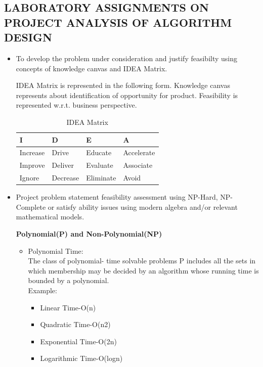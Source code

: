 \documentclass[12pt,a4paper]{report}
\begin{document}
\begin{appendices}
\chapter{LABORATORY ASSIGNMENTS ON PROJECT ANALYSIS OF ALGORITHM DESIGN}
\newpage

\begin{itemize}
	\item To develop the problem under consideration and justify feasibilty using
	concepts of knowledge canvas and IDEA Matrix.
	
	\hspace{0.5in}IDEA Matrix is represented in the following form. Knowledge canvas represents about identification of opportunity for product. Feasibility is represented w.r.t. business perspective.
	\begin{table}[!h]
		\centering
		\begin{tabular}{|p{2cm}|p{2cm}|p{2cm}|p{2cm}|}
		\hline
			I & D & E & A\\
			\hline
			Increase & Drive & Educate & Accelerate\\
			\hline
			Improve& Deliver& Evaluate& Associate\\
			\hline
			Ignore& Decrease& Eliminate& Avoid\\
			\hline
		\end{tabular}
		\caption{IDEA Matrix}
	\end{table}
	
	\item Project problem statement feasibility assessment using NP-Hard, NP-
	Complete or satisfy ability issues using modern algebra and/or relevant
	mathematical models.
	
	\textbf{Polynomial(P) and Non-Polynomial(NP)}
	\begin{itemize}
\item 	Polynomial Time:\\
	\hspace{0.5in}The class of polynomial- time solvable problems P includes all the sets in which membership may be decided by an algorithm whose running time is bounded by a polynomial.\\
	Example:
	\begin{itemize}
	\item Linear Time-O(n)
	\item Quadratic Time-O(n2)
	\item Exponential Time-O(2n)
	\item Logarithmic Time-O(logn)
	\end{itemize}
	

\end{itemize}
\end{itemize}
\end{appendices}
\end{document}
